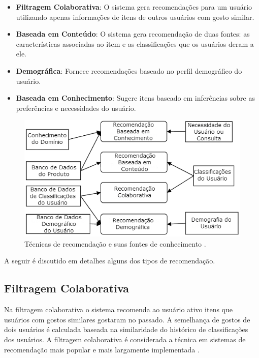 \begin{itemize}
	\item{\textbf{Filtragem Colaborativa}: O sistema gera recomendações para um usuário utilizando apenas informações de itens de outros usuários com gosto similar.}
	
	\item{\textbf{Baseada em Conteúdo}: O sistema gera recomendação de duas fontes: as características associadas ao item e as classificações que os usuários deram a ele.}
	
	\item{\textbf{Demográfica}: Fornece recomendações baseado no perfil demográfico do usuário.}
	
	\item{\textbf{Baseada em Conhecimento}: Sugere itens baseado em inferências sobre as preferências e necessidades do usuário.}
\end{itemize}

\begin{figure}
	\centering
	\includegraphics[scale=0.8]{imagens/recommendation_techniques_knowledg_sources.png}
	\caption{Técnicas de recomendação e suas fontes de conhecimento \citep{Burke:2007:HWR:1768197.1768211}.}
	\label{fig:tec_recomendacao_fontes_conhecimento}
\end{figure} 

	A seguir é discutido em detalhes alguns dos tipos de recomendação.
	
\subsection{Filtragem Colaborativa}

Na filtragem colaborativa o sistema recomenda ao usuário ativo itens que usuários com gostos similares gostaram no passado. A semelhança de gostos de dois usuários é calculada baseada na similaridade do histórico de classificações dos usuários. A filtragem colaborativa é considerada a técnica em sistemas de recomendação mais popular e mais largamente implementada \citep{ricci2011recommender}.

